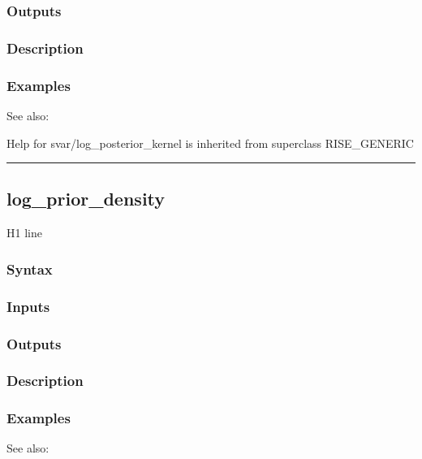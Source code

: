\documentclass[letterpaper,10pt,english]{sphinxmanual}
\begin{document}
\subsubsection{Outputs}
\label{classes/models/@svar/svar:id57}

\subsubsection{Description}
\label{classes/models/@svar/svar:id58}

\subsubsection{Examples}
\label{classes/models/@svar/svar:id59}
See also:

Help for svar/log\_posterior\_kernel is inherited from superclass RISE\_GENERIC


\bigskip\hrule{}\bigskip



\subsection{log\_prior\_density}
\label{classes/models/@svar/svar:id60}\label{classes/models/@svar/svar:log-prior-density}
H1 line


\subsubsection{Syntax}
\label{classes/models/@svar/svar:id61}

\subsubsection{Inputs}
\label{classes/models/@svar/svar:id62}

\subsubsection{Outputs}
\label{classes/models/@svar/svar:id63}

\subsubsection{Description}
\label{classes/models/@svar/svar:id64}

\subsubsection{Examples}
\label{classes/models/@svar/svar:id65}
See also:
\end{document}

